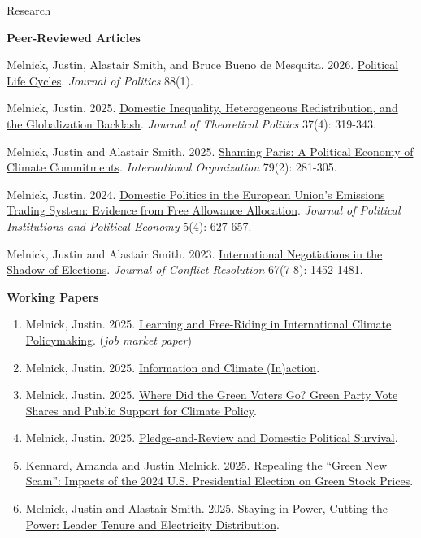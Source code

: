 \documentclass{resume} %
\begin{document}
\begin{rSection}{Research}

\textbf{Peer-Reviewed Articles}
\begin{etaremune}
 \item Melnick, Justin, Alastair Smith, and Bruce Bueno de Mesquita. 2026. \href{https://justinmelnick.github.io/papers/plc/paper.pdf}{Political Life Cycles}.  \textit{Journal of Politics} 88(1).
           \item Melnick, Justin. 2025. \href{https://justinmelnick.github.io/papers/exit/paper.pdf}{Domestic Inequality, Heterogeneous Redistribution, and the Globalization Backlash}.  \textit{Journal of Theoretical Politics} 37(4): 319-343.
            \item Melnick, Justin and Alastair Smith. 2025. \href{https://justinmelnick.github.io/papers/paris/paper.pdf}{Shaming Paris: A Political Economy of Climate Commitments}. \textit{International Organization} 79(2): 281-305.
\item Melnick, Justin. 2024. \href{https://justinmelnick.github.io/papers/ets/paper.pdf}{Domestic Politics in the European Union’s Emissions Trading System: Evidence from Free Allowance Allocation}. \textit{Journal of Political Institutions and Political Economy} 5(4): 627-657.
    \item Melnick, Justin and Alastair Smith. 2023. \href{https://justinmelnick.github.io/papers/nego/paper.pdf}{International Negotiations in the Shadow of Elections}.  \textit{Journal of Conflict Resolution} 67(7-8): 1452-1481.
\end{etaremune}

\textbf{Working Papers}
\begin{enumerate}
 \item Melnick, Justin. 2025. \href{https://justinmelnick.github.io/papers/complementarities/paper.pdf}{Learning and Free-Riding in International Climate Policymaking}. (\textit{job market paper})
                    \item Melnick, Justin. 2025. \href{https://justinmelnick.github.io/papers/inaction/paper.pdf}{Information and Climate (In)action}.
                        \item Melnick, Justin. 2025. \href{https://justinmelnick.github.io/papers/greens/paper.pdf}{Where Did the Green Voters Go? Green Party Vote Shares and Public Support for Climate Policy}.
                        \item Melnick, Justin. 2025. \href{https://justinmelnick.github.io/papers/pledge/paper.pdf}{Pledge-and-Review and Domestic Political Survival}.                        
                        \item Kennard, Amanda and Justin Melnick. 2025. \href{https://justinmelnick.github.io/papers/scam/paper.pdf}{Repealing the ``Green New Scam'': Impacts of the 2024 U.S. Presidential Election on Green Stock Prices}. 
                        \item Melnick, Justin and Alastair Smith. 2025. \href{https://justinmelnick.github.io/papers/electricity/paper.pdf}{Staying in Power, Cutting the Power: Leader Tenure and Electricity Distribution}. 


\end{enumerate}
\end{rSection}
\end{document}
